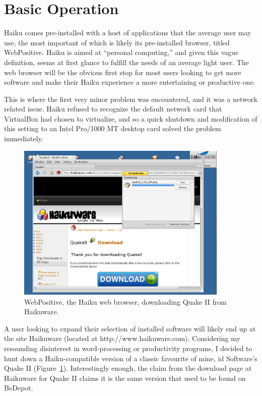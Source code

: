 \documentclass{article}
\newcommand{\figref}[1]{Figure~\ref{fig:#1}}
\begin{document}
\section{Basic Operation}

Haiku comes pre-installed with a host of applications that the average
user may use, the most important of which is likely its pre-installed
browser, titled WebPositive.  Haiku is aimed at ``personal
computing,'' and given this vague definition, seems at first glance to fulfill 
the needs of an average light user. The web browser will be the obvious first 
stop for most users looking to get more software and make their Haiku experience 
a more entertaining or productive one.
	
This is where the first very minor problem was encountered, and it was
a network related issue. Haiku refused to recognize the default
network card that VirtualBox had chosen to virtualize, and so a quick
shutdown and modification of this setting to an Intel Pro/1000 MT desktop card 
solved the problem immediately.
	
\begin{figure}[h]
\centering
\includegraphics[width=0.9\textwidth]{figs/using-quake-download.png}
\caption{WebPositive, the Haiku web browser, downloading Quake II from
  Haikuware.}
\label{fig:using-quake-download}
\end{figure}

A user looking to expand their selection of installed software will
likely end up at the site Haikuware (located at
http://www.haikuware.com).  Considering my resounding disinterest in
word-processing or productivity programs, I decided to hunt down a
Haiku-compatible version of a classic favourite of mine, id Software's
Quake II (\figref{using-quake-download}).  Interestingly enough, the
claim from the download page at Haikuware for Quake II claims it is
the same version that used to be found on BeDepot.
	
\end{document}
